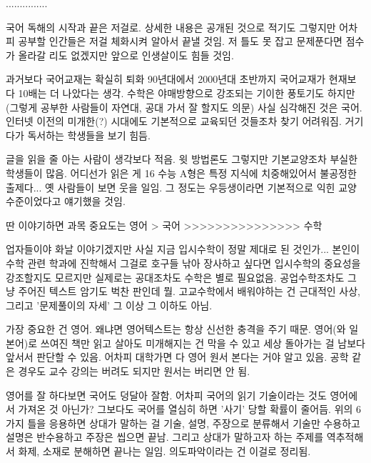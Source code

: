 ...............
\vspace{5mm}

국어 독해의 시작과 끝은 저걸로.
상세한 내용은 공개된 것으로 적기도 그렇지만 어차피 공부할 인간들은 저걸 체화시켜 알아서 끝낼 것임.
저 틀도 못 잡고 문제푼다면 점수가 올라갈 리도 없겠지만 앞으로 인생살이도 힘들 것임.
\vspace{5mm}

과거보다 국어교재는 확실히 퇴화
90년대에서 2000년대 초반까지 국어교재가 현재보다 10배는 더 나았다는 생각.
수학은 야매방향으로 강조되는 기이한 풍토기도 하지만(그렇게 공부한 사람들이 자연대, 공대 가서 잘 할지도 의문)
사실 심각해진 것은 국어. 인터넷 이전의 미개한(?) 시대에도 기본적으로 교육되던 것들조차 찾기 어려워짐.
거기다가 독서하는 학생들을 보기 힘듬.
\vspace{5mm}

글을 읽을 줄 아는 사람이 생각보다 적음.
윗 방법론도 그렇지만 기본교양조차 부실한 학생들이 많음.
어디선가 읽은 게 16 수능 A형은 특정 지식에 치중해있어서 불공정한 출제다...
옛 사람들이 보면 웃을 일임. 그 정도는 우등생이라면 기본적으로 익힌 교양수준이었다고 얘기했을 것임.
\vspace{5mm}

딴 이야기하면 과목 중요도는 영어 > 국어 >>>>>>>>>>>>>>> 수학
\vspace{5mm}

업자들이야 화날 이야기겠지만 사실 지금 입시수학이 정말 제대로 된 것인가...
본인이 수학 관련 학과에 진학해서 그걸로 호구들 낚아 장사하고 싶다면 입시수학의 중요성을 강조할지도 모르지만
실제로는 공대조차도 수학은 별로 필요없음. 공업수학조차도 그냥 주어진 텍스트 암기도 벅찬 판인데 뭘.
고교수학에서 배워야하는 건 근대적인 사상, 그리고 '문제풀이의 자세' 그 이상 그 이하도 아님.
\vspace{5mm}

가장 중요한 건 영어. 왜냐면 영어텍스트는 항상 신선한 충격을 주기 때문.
영어(와 일본어)로 쓰여진 책만 읽고 살아도 미개해지는 건 막을 수 있고 세상 돌아가는 걸 남보다 앞서서 판단할 수 있음.
어차피 대학가면 다 영어 원서 본다는 거야 알고 있음. 공학 같은 경우도 교수 강의는 버려도 되지만 원서는 버리면 안 됨.
\vspace{5mm}

영어를 잘 하다보면 국어도 덩달아 잘함. 어차피 국어의 읽기 기술이라는 것도 영어에서 가져온 것 아닌가?
그보다도 국어를 열심히 하면 '사기' 당할 확률이 줄어듬.
위의 6가지 틀을 응용하면 상대가 말하는 걸 기술, 설명, 주장으로 분류해서 기술만 수용하고 설명은 반수용하고 주장은 씹으면 끝남.
그리고 상대가 말하고자 하는 주제를 역추적해서 화제, 소재로 분해하면 끝나는 일임. 의도파악이라는 건 이걸로 정리됨.
\vspace{5mm}






